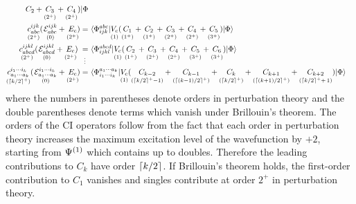\documentclass[11pt]{article}
\numberwithin{equation}{section}
\begin{document}
\begin{rmk}
\begin{align}
{{      C_2
    }
    +
    \underset{(2^+)}{\vphantom{(}
      C_3
    }
    +
    \underset{(2^+)}{\vphantom{(}
      C_4
    }
    )
  |\ensuremath{\Phi }}
\\
  \underset{(2^+)}{\vphantom{(}
  c_{abc}^{ijk}
  }
  (\hspace{1pt}
  \underset{(0)}{\vphantom{(}
    \mathcal{E}_{abc}^{ijk}
  }
  +
  \underset{(2^+)}{\vphantom{(}
    E_{\mathrm{c}}
  }
  \hspace{-2pt}
  )
=&\
  \langle\Phi _{ijk}^{abc}|
  \underset{(1)}{\vphantom{(}
    V_{\mathrm{c}}
  }
    (
    \underset{(1^+)}{\vphantom{(}
      C_1
    }
    +
    \underset{(1^+)}{\vphantom{(}
      C_2
    }
    +
    \underset{(2^+)}{\vphantom{(}
      C_3
    }
    +
    \underset{(2^+)}{\vphantom{(}
      C_4
    }
    +
    \underset{(3^+)}{\vphantom{(}
      C_5
    }
    )
  |\Phi \rangle
\\
  \underset{(2^+)}{\vphantom{(}
  c_{abcd}^{ijkl}
  }
  (\hspace{1pt}
  \underset{(0)}{\vphantom{(}
    \mathcal{E}_{abcd}^{ijkl}
  }
  +
  \underset{(2^+)}{\vphantom{(}
    E_{\mathrm{c}}
  }
  \hspace{-2pt}
  )
\underset{\hspace{2pt}\vdots}{\vphantom{(}
=
}&\
  \langle\Phi _{ijkl}^{abcd}|
  \underset{(1)}{\vphantom{(}
    V_{\mathrm{c}}
  }
    (
    \underset{(1^+)}{\vphantom{(}
      C_2
    }
    +
    \underset{(2^+)}{\vphantom{(}
      C_3
    }
    +
    \underset{(2^+)}{\vphantom{(}
      C_4
    }
    +
    \underset{(3^+)}{\vphantom{(}
      C_5
    }
    +
    \underset{(3^+)}{\vphantom{(}
      C_6
    }
    )
  |\Phi \rangle
\\
\label{eq:ci-k-tuples-equation}
  \underset{(\left\lceil k/2\right\rceil^+)}{\vphantom{(}
  c_{a_1\cdots a_k}^{i_1\cdots i_k}
  }
  (\hspace{1pt}
  \underset{(0)}{\vphantom{(}
    \mathcal{E}_{a_1\cdots a_k}^{i_1\cdots i_k}
  }
  +
  \underset{(2^+)}{\vphantom{(}
    E_{\mathrm{c}}
  }
  \hspace{-2pt}
  )
=&\
  \langle\Phi _{i_1\cdots i_k}^{a_1\cdots a_k}|
  \underset{(1)}{\vphantom{(}
    V_{\mathrm{c}}
  }
    (
    \underset{(\left\lceil k/2\right\rceil^+-1)}{\vphantom{(}
      C_{k-2}
    }
    +
    \underset{(\left\lceil(k-1)/2\right\rceil^+)}{\vphantom{(}
      C_{k-1}
    }
    +
    \underset{(\left\lceil k/2\right\rceil^+)}{\vphantom{(}
      C_k
    }
    +
    \underset{(\left\lceil(k+1)/2\right\rceil^+)}{\vphantom{(}
      C_{k+1}
    }
    +
    \underset{(\left\lceil k/2\right\rceil^++\,1)}{\vphantom{(}
      C_{k+2}
    }
    )
  |\Phi \rangle
\end{align}
where the numbers in parentheses denote orders in perturbation theory and the double parentheses denote terms which vanish under Brillouin's theorem.
The orders of the CI operators follow from the fact that each order in perturbation theory increases the maximum excitation level of the wavefunction by $+2$, starting from $\Psi ^{(1)}$ which contains up to doubles.
Therefore the leading contributions to $C_k$ have order $\left\lceil k/2\right\rceil$.
If Brillouin's theorem holds, the first-order contribution to $C_1$ vanishes and singles contribute at order $2^+$ in perturbation theory.
\end{rmk}
\end{document}
